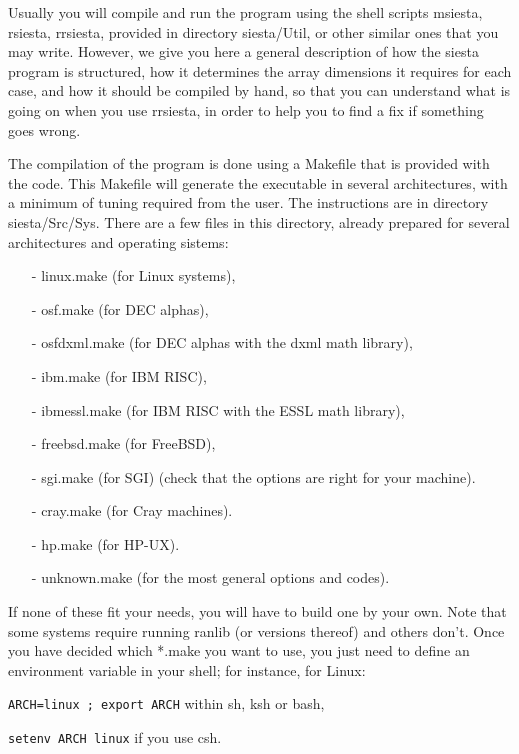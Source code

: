 Usually you will compile and run the program using the
shell scripts msiesta, rsiesta, rrsiesta, provided in
directory siesta/Util, or other similar ones that you may write.
However, we give you here a general description of how
the siesta program is structured, how it determines the
array dimensions it requires for each case, and how it
should be compiled by hand, so that you can understand
what is going on when you use rrsiesta, in order to help
you to find a fix if something goes wrong.

The compilation of the program is done using a Makefile
that is provided with the code.
This Makefile will generate the executable in several
architectures, with a  minimum of tuning required from the
user. The instructions are in directory siesta/Src/Sys.
There are a few files  in this directory,
already prepared for several architectures and
operating sistems: 
\begin{itemize}
\item[-] linux.make (for Linux systems),
\item[-] osf.make (for DEC alphas), 
\item[-] osfdxml.make (for DEC alphas with the dxml math library), 
\item[-] ibm.make (for IBM RISC), 
\item[-] ibmessl.make (for IBM RISC with the ESSL math library), 
\item[-] freebsd.make (for FreeBSD), 
\item[-] sgi.make (for SGI) 
      (check that the options are right for your machine).
\item[-] cray.make (for Cray machines).
\item[-] hp.make (for HP-UX).
\item[-] unknown.make (for the most general options and codes).
\end{itemize}
\noindent
If none of these fit your needs, you will have to build
one by your own. Note that some systems require running
ranlib (or versions thereof) and others don't.
Once you have decided which *.make you want to use,
you just need to define an environment variable
in your shell; for instance, for Linux:

\vspace{2pt}
{\tt ARCH=linux ; export ARCH} \hspace{1cm} within sh, ksh or bash,

\vspace{1pt}
{\tt setenv ARCH linux} \hspace{2.5cm} if you use csh.

